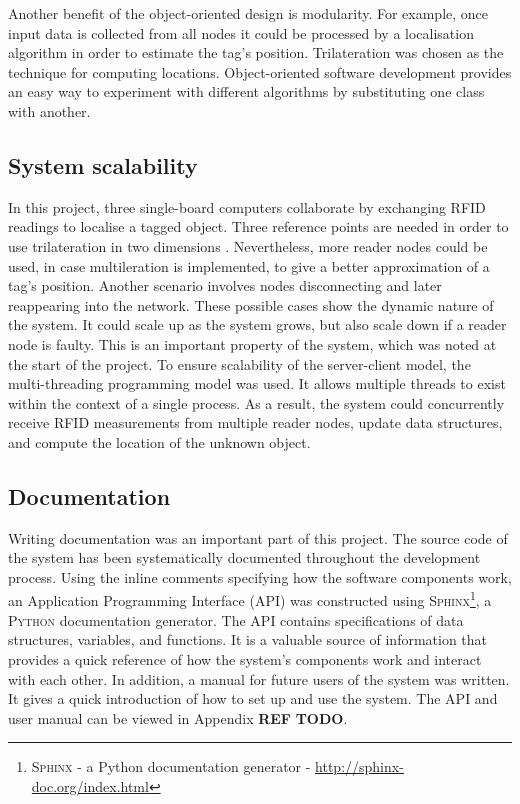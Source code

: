 Another benefit of the object-oriented design is modularity. For example, once input data is collected from all nodes it could be processed by a localisation algorithm in order to estimate the tag's position. Trilateration was chosen as the technique for computing locations. Object-oriented software development provides an easy way to experiment with different algorithms by substituting one class with another.

\subsection{System scalability}
\label{subsec:sysscal}

In this project, three single-board computers collaborate by exchanging RFID readings to localise a tagged object. Three reference points are needed in order to use trilateration in two dimensions  \cite{Zhang2009}. Nevertheless, more reader nodes could be used, in case multileration is implemented, to give a better approximation of a tag's position. Another scenario involves nodes disconnecting and later reappearing into the network. These possible cases show the dynamic nature of the system. It could scale up as the system grows, but also scale down if a reader node is faulty. This is an important property of the system, which was noted at the start of the project. To ensure scalability of the server-client model, the multi-threading programming model was used. It allows multiple threads to exist within the context of a single process. As a result, the system could concurrently receive RFID measurements from multiple reader nodes, update data structures, and compute the location of the unknown object.

\subsection{Documentation}

Writing documentation was an important part of this project. The source code of the system has been systematically documented throughout the development process. Using the inline comments specifying how the software components work, an Application Programming Interface (API) was constructed using \textsc{Sphinx}\footnote{\textsc{Sphinx} - a Python documentation generator - \url{http://sphinx-doc.org/index.html}}, a \textsc{Python} documentation generator. The API contains specifications of data structures, variables, and functions. It is a valuable source of information that provides a quick reference of how the system's components work and interact with each other. In addition, a manual for future users of the system was written. It gives a quick introduction of how to set up and use the system. The API and user manual can be viewed in Appendix \textbf{REF}  \textbf{TODO}.

